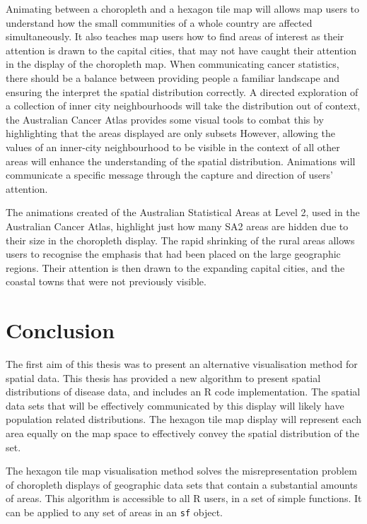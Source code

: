 \documentclass{monashthesis}
\begin{document}
Animating between a choropleth and a hexagon tile map will allows map users to understand how the small communities of a whole country are affected simultaneously. It also teaches map users how to find areas of interest as their attention is drawn to the capital cities, that may not have caught their attention in the display of the choropleth map. When communicating cancer statistics, there should be a balance between providing people a familiar landscape and ensuring the interpret the spatial distribution correctly. A directed exploration of a collection of inner city neighbourhoods will take the distribution out of context, the Australian Cancer Atlas provides some visual tools to combat this by highlighting that the areas displayed are only subsets However, allowing the values of an inner-city neighbourhood to be visible in the context of all other areas will enhance the understanding of the spatial distribution. Animations will communicate a specific message through the capture and direction of users' attention.

The animations created of the Australian Statistical Areas at Level 2, used in the Australian Cancer Atlas, highlight just how many SA2 areas are hidden due to their size in the choropleth display. The rapid shrinking of the rural areas allows users to recognise the emphasis that had been placed on the large geographic regions.
Their attention is then drawn to the expanding capital cities, and the coastal towns that were not previously visible.

\hypertarget{ch:conclusion}{%
\chapter{Conclusion}\label{ch:conclusion}}

The first aim of this thesis was to present an alternative visualisation method for spatial data. This thesis has provided a new algorithm to present spatial distributions of disease data, and includes an R code \autocite{R} implementation. The spatial data sets that will be effectively communicated by this display will likely have population related distributions. The hexagon tile map display will represent each area equally on the map space to effectively convey the spatial distribution of the set.

The hexagon tile map visualisation method solves the misrepresentation problem of choropleth displays of geographic data sets that contain a substantial amounts of areas. This algorithm is accessible to all R users, in a set of simple functions. It can be applied to any set of areas in an \texttt{sf} \autocite{sf} object.
\end{document}
